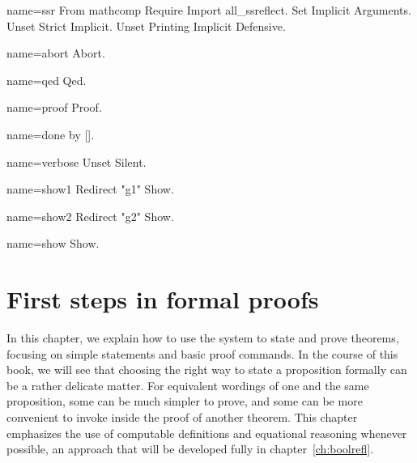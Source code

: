 \begin{coqdef}{name=ssr}
From mathcomp Require Import all_ssreflect.
Set Implicit Arguments.
Unset Strict Implicit.
Unset Printing Implicit Defensive.
\end{coqdef}
\begin{coqdef}{name=abort}
Abort.
\end{coqdef}
\begin{coqdef}{name=qed}
Qed.
\end{coqdef}
\begin{coqdef}{name=proof}
Proof.
\end{coqdef}
\begin{coqdef}{name=done}
by [].
\end{coqdef}
\begin{coqdef}{name=verbose}
Unset Silent.
\end{coqdef}
\begin{coqdef}{name=show1}
Redirect "g1" Show.
\end{coqdef}
\begin{coqdef}{name=show2}
Redirect "g2" Show.
\end{coqdef}
\begin{coqdef}{name=show}
Show.
\end{coqdef}


\chapter{First steps in formal proofs}{}
\label{ch:proofs}

In this chapter, we explain how to use the \Coq{} system to state and
prove theorems, focusing on simple statements and basic proof
commands. In the course of this book, we will see that choosing the
right way to state a proposition formally can be a rather delicate
matter. For equivalent wordings of one and the same
proposition, some can be
much simpler to prove, and some can be more convenient to invoke
inside the proof of another theorem. This chapter emphasizes
the use of computable definitions and equational reasoning
whenever possible, an approach that will be developed fully in
chapter~\ref{ch:boolrefl}.

